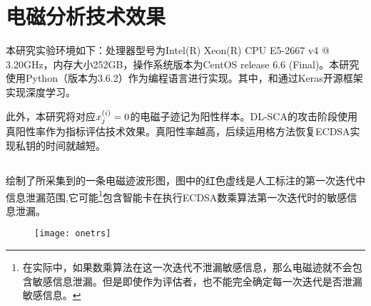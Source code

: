 {{	\section{电磁分析技术效果}\label{sec:ecdsaresult}
	本研究实验环境如下：处理器型号为Intel(R) Xeon(R) CPU E5-2667 v4 @ 3.20GHz，内存大小252GB，操作系统版本为CentOS release 6.6 (Final)。本研究使用Python（版本为3.6.2）作为编程语言进行实现。其中，\shujuzengqiang 和\jiashejianyanguji 通过Keras开源框架实现深度学习。
	
	此外，本研究将对应$x^{(i)}_j=0$的电磁子迹记为阳性样本。DL-SCA的攻击阶段使用真阳性率作为指标评估技术效果。真阳性率越高，后续运用格方法恢复ECDSA实现私钥的时间就越短。
	
	\subsection{\yuchuli}
	
	绘制了所采集到的一条电磁迹波形图，图中的红色虚线是人工标注的第一次迭代中信息泄漏范围,它可能\footnote{在实际中，如果数乘算法在这一次迭代不泄漏敏感信息，那么电磁迹就不会包含敏感信息泄漏。但是即使作为评估者，也不能完全确定每一次迭代是否泄漏敏感信息。}包含智能卡在执行ECDSA数乘算法第一次迭代时的敏感信息泄漏。%
	
	\begin{figure}[!h]
		\begin{center}
			\texttt{[image: onetrs]}
			\label{fig:onetrs}
		\end{center}
	\end{figure}
	
}}
